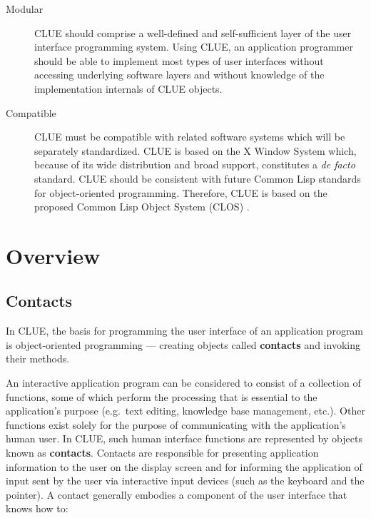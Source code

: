 \documentclass[twoside]{book}
\begin{document}
\begin{sloppy}
\begin{description}
\item [Modular] CLUE should comprise a well-defined and
  self-sufficient layer of the user interface programming
  system. Using CLUE, an application programmer should be able to
  implement most types of user interfaces without accessing underlying
  software layers and without knowledge of the implementation
  internals of CLUE objects.


\item [Compatible] CLUE must be compatible with related software
  systems which will be separately standardized. CLUE is based on the
  X Window System  which, because of its wide
  distribution and broad support, constitutes a {\it de facto}
  standard\footnotemark. CLUE should be consistent with future Common
  Lisp standards for object-oriented programming. Therefore, CLUE is
  based on the proposed Common Lisp Object System (CLOS)
  \cite{clos}.

\end{description}



\section {Overview}
\subsection {Contacts}

In CLUE, the basis for programming the user interface of an application
program is object-oriented programming --- creating objects called
{\bf contacts} and invoking their methods. 

An interactive application program can be considered to consist of a collection
of functions,  some of which perform the processing that is essential
to the application's purpose (e.g.\ text editing, knowledge base management,
etc.). Other functions exist solely for the purpose of communicating with
the application's human user. In CLUE, such human interface functions are
represented by objects known as {\bf contacts}. Contacts are responsible for
presenting application information to the user on the display screen and for
informing the application of input sent by the user via interactive input
devices (such as the keyboard and the pointer). A contact generally embodies a
component of the user interface that knows how to:


\end{sloppy}
\end{document}
